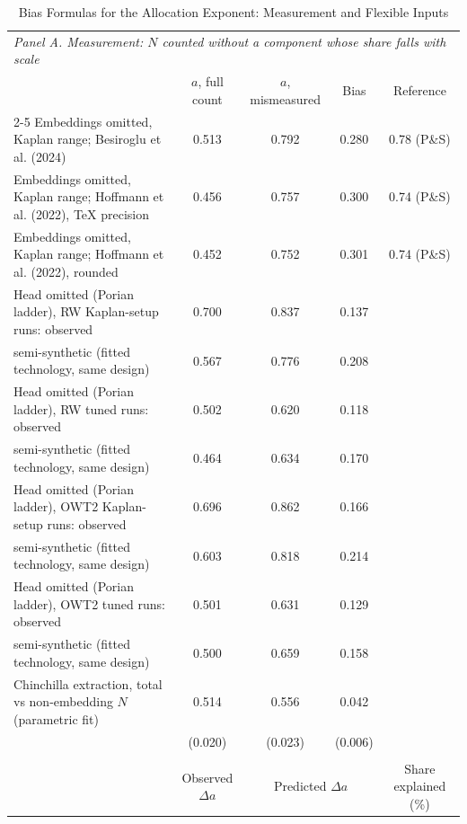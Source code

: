 \begin{table}[htbp]
\centering
\scriptsize
\begin{threeparttable}
\caption{Bias Formulas for the Allocation Exponent: Measurement and Flexible Inputs}
\label{tab:m8_biasformulas}
\begin{tabular}{p{6.0cm}cccc}
\toprule
\multicolumn{5}{l}{\textit{Panel A. Measurement: $N$ counted without a component whose share falls with scale}}  \\
\addlinespace
 & $a$, full count & $a$, mismeasured & Bias & Reference  \\
\cmidrule(lr){2-5}
Embeddings omitted, Kaplan range; Besiroglu et al. (2024) & 0.513 & 0.792 & 0.280 & 0.78 (P\&S) \\
Embeddings omitted, Kaplan range; Hoffmann et al. (2022), TeX precision & 0.456 & 0.757 & 0.300 & 0.74 (P\&S) \\
Embeddings omitted, Kaplan range; Hoffmann et al. (2022), rounded & 0.452 & 0.752 & 0.301 & 0.74 (P\&S) \\
Head omitted (Porian ladder), RW Kaplan-setup runs: observed & 0.700 & 0.837 & 0.137 &  \\
\quad semi-synthetic (fitted technology, same design) & 0.567 & 0.776 & 0.208 &  \\
Head omitted (Porian ladder), RW tuned runs: observed & 0.502 & 0.620 & 0.118 &  \\
\quad semi-synthetic (fitted technology, same design) & 0.464 & 0.634 & 0.170 &  \\
Head omitted (Porian ladder), OWT2 Kaplan-setup runs: observed & 0.696 & 0.862 & 0.166 &  \\
\quad semi-synthetic (fitted technology, same design) & 0.603 & 0.818 & 0.214 &  \\
Head omitted (Porian ladder), OWT2 tuned runs: observed & 0.501 & 0.631 & 0.129 &  \\
\quad semi-synthetic (fitted technology, same design) & 0.500 & 0.659 & 0.158 &  \\
Chinchilla extraction, total vs non-embedding $N$ (parametric fit) & 0.514 & 0.556 & 0.042 &  \\
 & (0.020) & (0.023) & (0.006) &  \\
\addlinespace
\multicolumn{5}{l}{\textit{Panel B. Flexible inputs: first-order argmin-shift formula, $\Delta a=-\partial_{\ln C}[\Delta(C)/f''(C)]$}}  \\
\addlinespace
 & Observed $\Delta a$ & \multicolumn{2}{c}{Predicted $\Delta a$} & Share explained (\%)  \\

\end{tabular}
\end{threeparttable}
\end{table}
